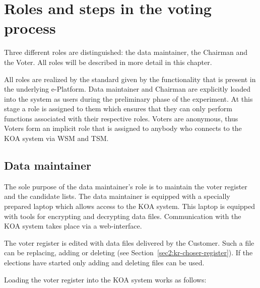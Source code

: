 \chapter{Roles and steps in the voting process}\label{cha:role-steps-voting}

Three different roles are distinguished: the data maintainer, the
Chairman and the Voter. All roles will be described in more detail in
this chapter.

All roles are realized by the standard given by the functionality that
is present in the underlying e-Platform. Data maintainer and Chairman
are explicitly loaded into the system as users during the preliminary
phase of the experiment. At this stage a role is assigned to them
which ensures that they can only perform functions associated with
their respective roles. Voters are anonymous, thus Voters form an
implicit role that is assigned to anybody who connects to the KOA
system via WSM and TSM.

\section{Data maintainer}\label{sec3:data-maintainer}

The sole purpose of the data maintainer's role is to maintain the
voter register and the candidate lists. The data maintainer is
equipped with a specially prepared laptop which allows access to the
KOA system. This laptop is equipped with tools for encrypting and
decrypting data files. Communication with the KOA system takes place
via a web-interface.

The voter register is edited with data files delivered by the
Customer. Such a file can be replacing, adding or deleting (see
Section~\ref{sec2:kr-choser-register}). If the elections have started
only adding and deleting files can be used.

Loading the voter register into the KOA system works as follows:

